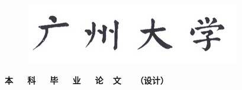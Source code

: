 \documentclass[12pt,a4paper,AutoFakeBold]{article}
\begin{document}

\begin{titlepage}
\vspace*{0.15cm}

\begin{figure}[H]
	\centering
	\includegraphics[scale=1.25]{assets/gzhu.png}
\end{figure}
\vspace{0.15cm}	
\centering

{\kai \textbf{本~~~科~~~毕~~~业~~~论~~文~~~（设计）}}

\vspace{2.5cm}



\end{titlepage}
\end{document}
